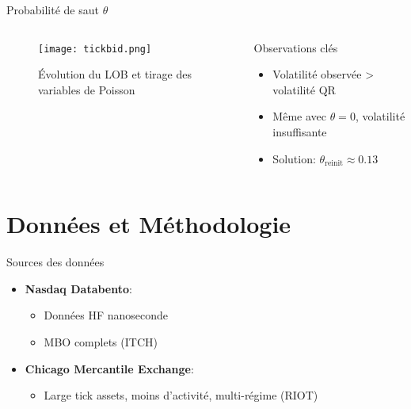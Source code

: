 \documentclass[aspectratio=169]{beamer}  %
\begin{document}
\begin{frame}{Probabilité de saut $\theta$}
    \begin{columns}
        \begin{column}{0.6\textwidth}
            \begin{figure}
                \centering
                \texttt{[image: tickbid.png]}
                \caption{Évolution du LOB et tirage des variables de Poisson}
            \end{figure}
        \end{column}
        \begin{column}{0.4\textwidth}
            \begin{alertblock}{Observations clés}
                \begin{itemize}
                    \item Volatilité observée > volatilité QR
                    \item Même avec $\theta=0$, volatilité insuffisante
                    \item Solution: $\theta_{\text{reinit}}\approx0.13$
                \end{itemize}
            \end{alertblock}
        \end{column}
    \end{columns}
\end{frame}











\section{Données et Méthodologie}

\begin{frame}{Sources des données}
    \begin{itemize}
        \item \textbf{Nasdaq Databento}:
        \begin{itemize}
            \item Données HF nanoseconde
            \item MBO complets (ITCH)
        \end{itemize}
        \item \textbf{Chicago Mercantile Exchange}:
        \begin{itemize}
            \item Large tick assets, moins d'activité, multi-régime (RIOT)
        \end{itemize}
    \end{itemize}
\end{frame}
\end{document}
